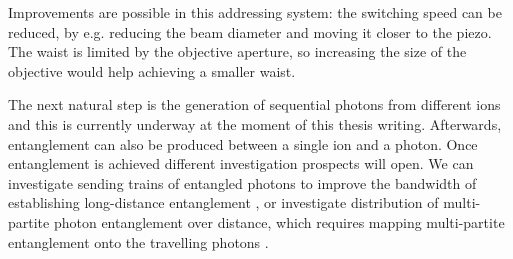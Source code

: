 Improvements are possible in this addressing system: the switching speed can be reduced, by e.g. reducing the beam diameter and moving it closer to the piezo. The waist is limited by the objective aperture, so increasing the size of the objective would help achieving a smaller waist.\par
The next natural step is the generation of sequential photons from different ions and this is currently underway at the moment of this thesis writing. Afterwards, entanglement can also be produced between a single ion and a photon. Once entanglement is achieved different investigation prospects will open. We can investigate sending trains of entangled photons to improve the bandwidth of establishing long-distance entanglement \cite{Krutyanskiy2019}, or investigate distribution of multi-partite photon entanglement over distance, which requires mapping multi-partite entanglement onto the travelling photons \cite{Arenskotter:19}.
